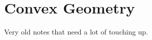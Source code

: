 \begingroup
    \ifcsname\PATH\endcsname
        \newcommand{\PATH}{books/Geometry/Euclidean_Geometry}
        \newcommand{\OLDPATH}{\PATH}
    \else
        \newcommand{\OLDPATH}{\PATH}
        \renewcommand{\PATH}{books/Geometry/Euclidean_Geometry}
    \fi
    \chapter{Convex Geometry}
        \label{chapt:Euclidean_Spaces}%
        Very old notes that need a lot of touching up.
        
    \renewcommand{\PATH}{\OLDPATH}
\endgroup